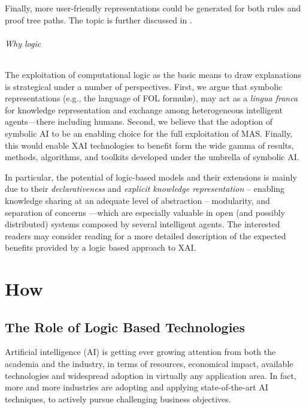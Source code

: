 \documentclass[12pt,a4paper,openright,twoside]{book}
\begin{document}
Finally, more user-friendly representations could be generated for both rules and proof tree paths.
%
The topic is further discussed in \cite{xailp-woa2019}.

\paragraph{Why logic}

The exploitation of computational logic as the basic means to draw explanations is strategical under a number of perspectives.
%
First, we argue that symbolic representations (e.g., the language of FOL formul\ae{}), may act as a \emph{lingua franca} for knowledge representation and exchange among heterogeneous intelligent agents---there including humans.
%
Second, we believe that the adoption of symbolic AI to be an enabling choice for the full exploitation of MAS.
%
Finally, this would enable XAI technologies to benefit form the wide gamma of results, methods, algorithms, and toolkits developed under the umbrella of symbolic AI.

In particular, the potential of logic-based models and their extensions is mainly due to their \emph{declarativeness} and \emph{explicit knowledge representation} -- enabling knowledge sharing at an adequate level of abstraction -- modularity, and separation of concerns \cite{OliyaP2011}---which are especially valuable in open (and possibly distributed) systems composed by several intelligent agents.
%
The interested readers may consider reading \cite{xmas-aiiot2019, expectation-extraamas2021} for a more detailed description of the expected benefits provided by a logic based approach to XAI.

\part{How}
\label{part:how}

\chapter{The Role of Logic Based Technologies}
\label{chap:lbt-role}


Artificial intelligence (AI) is getting ever growing attention from both the academia and the industry, in terms of resources, economical impact, available technologies and widespread adoption in virtually any application area.
%
In fact, more and more industries are adopting and applying state-of-the-art AI techniques, to actively pursue challenging business objectives.
\end{document}

